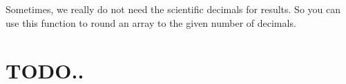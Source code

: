 \documentclass[letterpaper,12pt,english]{sphinxmanual}
\begin{document}
\section{}
\label{\detokenize{primer:round}}
Sometimes, we really do not need the scientific decimals for  results. So you can use this function to round an array to the given number of decimals.

\begin{quote}

\begin{sphinxVerbatim}[commandchars=\\\{\}]
\PYG{p}{[}\PYG{p}{]}
\end{sphinxVerbatim}
\end{quote}

\begin{quote}

\begin{sphinxVerbatim}[commandchars=\\\{\}]
\PYG{p}{[}\PYG{p}{[}    \PYG{p}{]}
       \PYG{p}{[}   \PYG{p}{]}\PYG{p}{]}
\end{sphinxVerbatim}
\end{quote}


\section{TODO..}
\label{\detokenize{primer:todo}}

\begin{sphinxVerbatim}[commandchars=\\\{\}]

\end{sphinxVerbatim}


\begin{sphinxVerbatim}[commandchars=\\\{\}]

\end{sphinxVerbatim}
\end{document}
